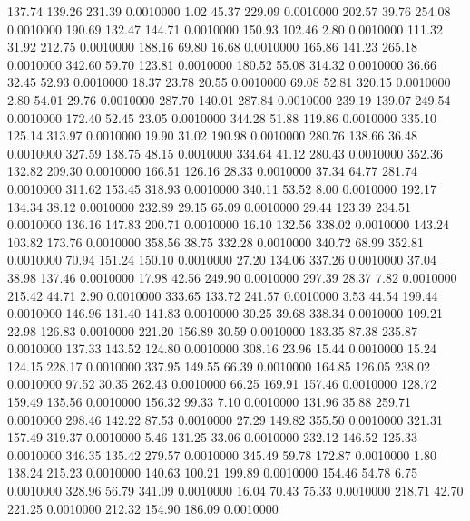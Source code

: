 137.74  139.26  231.39   0.0010000
   1.02   45.37  229.09   0.0010000
 202.57   39.76  254.08   0.0010000
 190.69  132.47  144.71   0.0010000
 150.93  102.46    2.80   0.0010000
 111.32   31.92  212.75   0.0010000
 188.16   69.80   16.68   0.0010000
 165.86  141.23  265.18   0.0010000
 342.60   59.70  123.81   0.0010000
 180.52   55.08  314.32   0.0010000
  36.66   32.45   52.93   0.0010000
  18.37   23.78   20.55   0.0010000
  69.08   52.81  320.15   0.0010000
   2.80   54.01   29.76   0.0010000
 287.70  140.01  287.84   0.0010000
 239.19  139.07  249.54   0.0010000
 172.40   52.45   23.05   0.0010000
 344.28   51.88  119.86   0.0010000
 335.10  125.14  313.97   0.0010000
  19.90   31.02  190.98   0.0010000
 280.76  138.66   36.48   0.0010000
 327.59  138.75   48.15   0.0010000
 334.64   41.12  280.43   0.0010000
 352.36  132.82  209.30   0.0010000
 166.51  126.16   28.33   0.0010000
  37.34   64.77  281.74   0.0010000
 311.62  153.45  318.93   0.0010000
 340.11   53.52    8.00   0.0010000
 192.17  134.34   38.12   0.0010000
 232.89   29.15   65.09   0.0010000
  29.44  123.39  234.51   0.0010000
 136.16  147.83  200.71   0.0010000
  16.10  132.56  338.02   0.0010000
 143.24  103.82  173.76   0.0010000
 358.56   38.75  332.28   0.0010000
 340.72   68.99  352.81   0.0010000
  70.94  151.24  150.10   0.0010000
  27.20  134.06  337.26   0.0010000
  37.04   38.98  137.46   0.0010000
  17.98   42.56  249.90   0.0010000
 297.39   28.37    7.82   0.0010000
 215.42   44.71    2.90   0.0010000
 333.65  133.72  241.57   0.0010000
   3.53   44.54  199.44   0.0010000
 146.96  131.40  141.83   0.0010000
  30.25   39.68  338.34   0.0010000
 109.21   22.98  126.83   0.0010000
 221.20  156.89   30.59   0.0010000
 183.35   87.38  235.87   0.0010000
 137.33  143.52  124.80   0.0010000
 308.16   23.96   15.44   0.0010000
  15.24  124.15  228.17   0.0010000
 337.95  149.55   66.39   0.0010000
 164.85  126.05  238.02   0.0010000
  97.52   30.35  262.43   0.0010000
  66.25  169.91  157.46   0.0010000
 128.72  159.49  135.56   0.0010000
 156.32   99.33    7.10   0.0010000
 131.96   35.88  259.71   0.0010000
 298.46  142.22   87.53   0.0010000
  27.29  149.82  355.50   0.0010000
 321.31  157.49  319.37   0.0010000
   5.46  131.25   33.06   0.0010000
 232.12  146.52  125.33   0.0010000
 346.35  135.42  279.57   0.0010000
 345.49   59.78  172.87   0.0010000
   1.80  138.24  215.23   0.0010000
 140.63  100.21  199.89   0.0010000
 154.46   54.78    6.75   0.0010000
 328.96   56.79  341.09   0.0010000
  16.04   70.43   75.33   0.0010000
 218.71   42.70  221.25   0.0010000
 212.32  154.90  186.09   0.0010000
